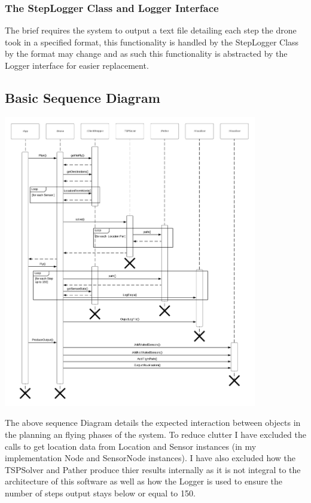 \documentclass[12pt]{article}
\begin{document}
\subsubsection{The StepLogger Class and Logger Interface}
The brief requires the system to output a text file detailing each step the drone took in a specified format, this functionality is handled by the StepLogger Class by the format may change and as such this functionality is abstracted by the Logger interface for easier replacement.
\subsection{Basic Sequence Diagram}
\begin{center}
    \includegraphics[width=0.83\textwidth]{Drone Sequence Diagram.png}
\end{center}
\newpage

The above sequence Diagram details the expected interaction between objects in the planning an flying phases of the system. To reduce clutter I have excluded the calls to get location data from Location and Sensor instances (in my implementation Node and SensorNode instances). I have also excluded how the TSPSolver and Pather produce thier results internally as it is not integral to the architecture of this software as well as how the Logger is used to ensure the number of steps output stays below or equal to 150.
\end{document}

